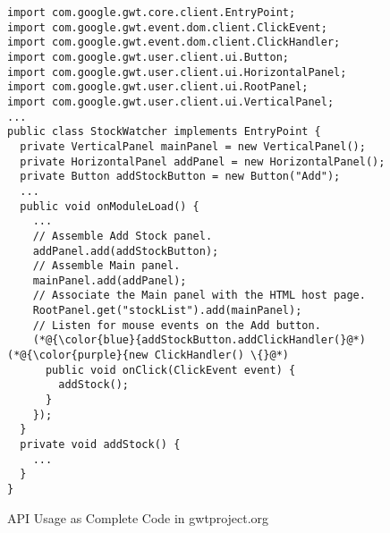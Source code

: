 \begin{figure}[htbp]
	\centering
\begin{lstlisting}[]
import com.google.gwt.core.client.EntryPoint;
import com.google.gwt.event.dom.client.ClickEvent;
import com.google.gwt.event.dom.client.ClickHandler;
import com.google.gwt.user.client.ui.Button;
import com.google.gwt.user.client.ui.HorizontalPanel;
import com.google.gwt.user.client.ui.RootPanel;
import com.google.gwt.user.client.ui.VerticalPanel;
...
public class StockWatcher implements EntryPoint {
  private VerticalPanel mainPanel = new VerticalPanel();
  private HorizontalPanel addPanel = new HorizontalPanel();
  private Button addStockButton = new Button("Add");
  ...
  public void onModuleLoad() {
    ...
    // Assemble Add Stock panel.
    addPanel.add(addStockButton);
    // Assemble Main panel.
    mainPanel.add(addPanel);
    // Associate the Main panel with the HTML host page.
    RootPanel.get("stockList").add(mainPanel);
    // Listen for mouse events on the Add button.
    (*@{\color{blue}{addStockButton.addClickHandler(}@*) (*@{\color{purple}{new ClickHandler() \{}@*)
      public void onClick(ClickEvent event) {
        addStock();
      }
    });
  }
  private void addStock() {
    ...
  }
}
\end{lstlisting}
        \vspace{-12pt}
        \caption{API Usage as Complete Code in gwtproject.org}
        \label{fig:example3}
\end{figure}
